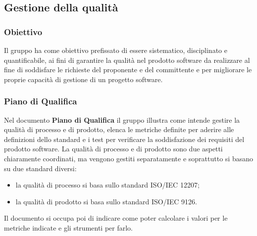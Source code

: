\subsection{Gestione della qualità}
\subsubsection{Obiettivo}
Il gruppo \Gruppo{} ha come obiettivo prefissato di essere sistematico, disciplinato e quantificabile, ai fini di garantire la qualità nel prodotto software da realizzare al fine di soddisfare le richieste del proponente e del committente e per migliorare le proprie capacità di gestione di un progetto software.

\subsubsection{Piano di Qualifica}
Nel documento \textbf{Piano di Qualifica} il gruppo illustra come intende gestire la qualità di processo e di prodotto, elenca le metriche definite per aderire alle definizioni dello standard e i test per verificare la soddisfazione dei requisiti del prodotto software.
La qualità di processo e di prodotto sono due aspetti chiaramente coordinati, ma vengono gestiti separatamente e soprattutto si basano su due standard diversi:
\begin{itemize}
    \item la qualità di processo si basa sullo standard ISO/IEC 12207;
    \item la qualità di prodotto si basa sullo standard ISO/IEC 9126.
\end{itemize}
Il documento si occupa poi di indicare come poter calcolare i valori per le metriche indicate e gli strumenti per farlo.